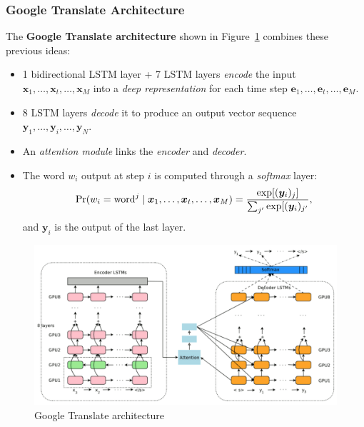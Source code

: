 \subsubsection{Google Translate Architecture}
The \textbf{Google Translate architecture} shown in Figure~\ref{fig:google_translate} combines these previous ideas:
\begin{itemize}
	\item 1 bidirectional LSTM layer + 7 LSTM layers \emph{encode} the input \(\bm{x}_1, \dots, \bm{x}_t, \dots, \bm{x}_M\) into a \emph{deep representation} for each time step \(\bm{e}_1, \dots, \bm{e}_t, \dots, \bm{e}_M\).
	\item 8 LSTM layers \emph{decode} it to produce an output vector sequence \(\bm{y}_1, \dots, \bm{y}_i, \dots, \bm{y}_N\).
	\item An \emph{attention module} links the \emph{encoder} and \emph{decoder}.
	\item The word \(w_i\) output at step \(i\) is computed through a \emph{softmax} layer:
	\[
	\Pr(w_i = \textnormal{word}^j \mid \bm{x}_1, \dots, \bm{x}_t, \dots, \bm{x}_M) = \frac{\exp[(\bm{y}_i)_j]}{\sum_{j'} \exp[(\bm{y}_i)_{j'}},
	\]
	and \(\bm{y}_i\) is the output of the last layer.
\end{itemize}
\begin{figure}[!hbtp]
	\centering
	\includegraphics[width=\textwidth]{img/google_translate}
	\caption{Google Translate architecture}
	\label{fig:google_translate}
\end{figure}

